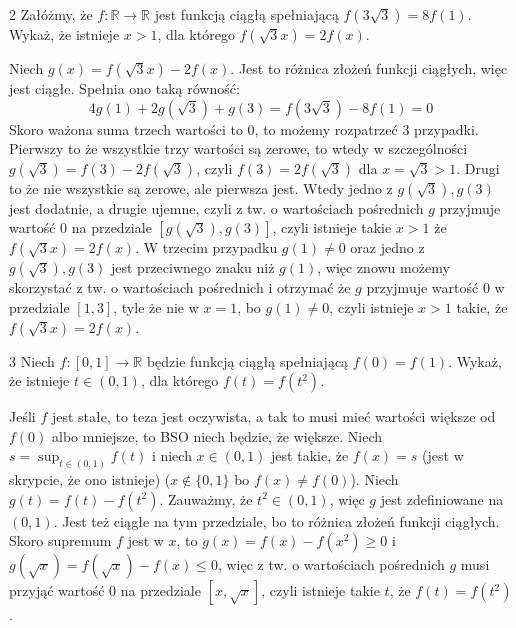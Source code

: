 \documentclass{../note}
\begin{document}
\begin{zadanie}{2}
Załóżmy, że $f:\mathbb{R}\rightarrow\mathbb{R}$ jest funkcją ciągłą spełniającą $f(3\sqrt{3})=8f(1).$ Wykaż, że istnieje $x>1$, dla którego $f(\sqrt{3}x)=2f(x)$.
\end{zadanie}
\begin{rozwiazanie}
Niech $g(x) = f(\sqrt{3}x)-2f(x)$. Jest to różnica złożeń funkcji ciągłych, więc jest ciągłe. Spełnia ono taką równość:
\[4g(1) + 2g(\sqrt{3}) + g(3) = f(3\sqrt{3}) - 8f(1) = 0\]
Skoro ważona suma trzech wartości to 0, to możemy rozpatrzeć 3 przypadki. Pierwszy to że wszystkie trzy wartości są zerowe, to wtedy w szczególności $g(\sqrt{3}) = f(3) - 2f(\sqrt{3})$, czyli $f(3)=2f(\sqrt{3})$ dla $x=\sqrt 3 > 1$. Drugi to że nie wszystkie są zerowe, ale pierwsza jest. Wtedy jedno z $g(\sqrt{3}), g(3)$ jest dodatnie, a drugie ujemne, czyli z tw. o wartościach pośrednich $g$ przyjmuje wartość 0 na przedziale $[g(\sqrt{3}), g(3)]$, czyli istnieje takie $x>1$ że $f(\sqrt{3}x)=2f(x)$. W trzecim przypadku $g(1) \neq 0$ oraz jedno z $g(\sqrt 3), g(3)$ jest przeciwnego znaku niż $g(1)$, więc znowu możemy skorzystać z tw. o wartościach pośrednich i otrzymać że $g$ przyjmuje wartość 0 w przedziale $[1, 3]$, tyle że nie w $x = 1$, bo $g(1) \neq 0$, czyli istnieje $x > 1$ takie, że $f(\sqrt{3}x)=2f(x)$.
\end{rozwiazanie}

\begin{zadanie}{3}
Niech $f:[0,1]\rightarrow\mathbb{R}$ będzie funkcją ciągłą spełniającą $f(0)=f(1).$ Wykaż, że istnieje $t\in(0,1)$, dla którego $f(t)=f(t^{2})$.
\end{zadanie}
\begin{rozwiazanie}
Jeśli $f$ jest stałe, to teza jest oczywista, a tak to musi mieć wartości większe od $f(0)$ albo mniejsze, to BSO niech będzie, że większe. Niech $s = \sup_{t\in(0, 1)} f(t)$ i niech $x\in(0, 1)$ jest takie, że $f(x) = s$ (jest w skrypcie, że ono istnieje) ($x \notin \{0, 1\}$ bo $f(x) \neq f(0)$). Niech $g(t) = f(t) - f(t^2)$. Zauważmy, że $t^2 \in (0,1)$, więc $g$ jest zdefiniowane na $(0, 1)$. Jest też ciągłe na tym przedziale, bo to różnica złożeń funkcji ciągłych. Skoro supremum $f$ jest w $x$, to $g(x) = f(x) - f(x^2) \geq 0$ i $g(\sqrt x) = f(\sqrt x) - f(x) \leq 0$, więc z tw. o wartościach pośrednich $g$ musi przyjąć wartość 0 na przedziale $[x, \sqrt x]$, czyli istnieje takie $t$, że $f(t) = f(t^2)$.
\end{rozwiazanie}
\end{document}
